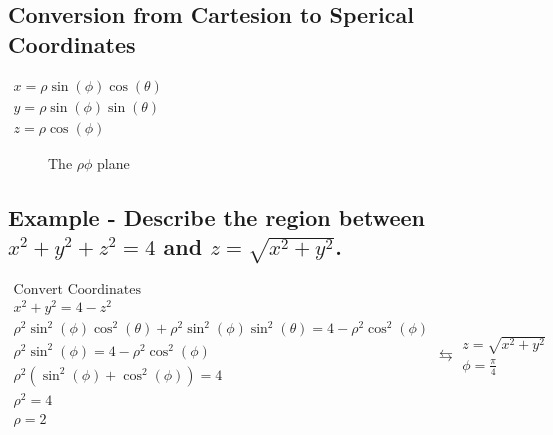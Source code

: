 \documentclass{article}
\begin{document}
    \subsection{Conversion from Cartesion to Sperical Coordinates}
    $
    \begin{aligned}
    x=\rho \sin(\phi)\cos(\theta)\\
    y=\rho \sin(\phi)\sin(\theta)\\
    z=\rho \cos(\phi)
    \end{aligned}
    $

    \begin{figure}[ht]
    \centering
    \caption{The $\rho \phi$ plane}
    \end{figure}

    \subsection{Example - Describe the region between $x^2 + y^2 + z^2 = 4$ and $z=\sqrt{x^2 + y^2}$.}

    \[
    \begin{aligned}
    \text{Convert Coordinates}\\
    x^2 + y^2 = 4-z^2\\
    \rho^2 \sin^2(\phi)\cos^2(\theta) + \rho^2 \sin^2(\phi) \sin^2(\theta) = 4 - \rho^2 \cos^2(\phi)\\
    \rho^2 \sin^2(\phi) = 4 - \rho^2 \cos^2(\phi)\\
    \rho^2(\sin^2(\phi) + \cos^2(\phi)) = 4\\
    \rho^2 = 4\\
    \rho = 2
    \end{aligned}
    \leftrightarrows
    \begin{aligned}
    z = \sqrt{x^2 + y^2}\\
    \phi = \frac{\pi}{4}
    \end{aligned}
    \]
\end{document}
